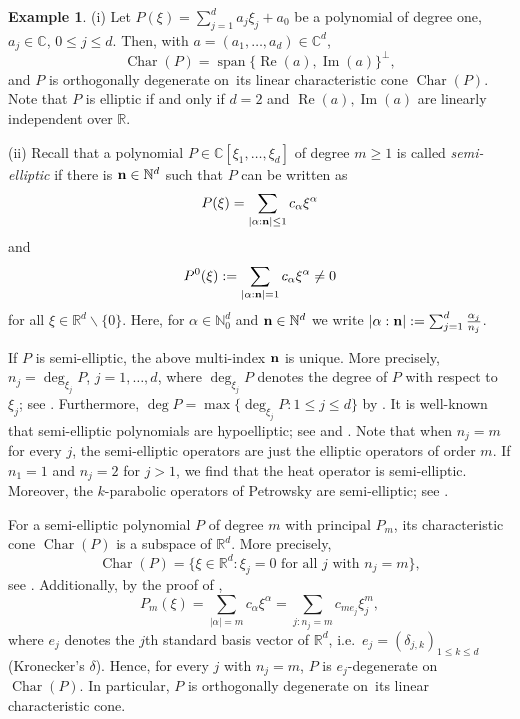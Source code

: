 \documentclass[a4paper,10pt]{amsart}
\newtheorem*{crucial lemma}{Lemma \ref{lem:nice polynomial2}}
\theoremstyle{definition}
\newtheorem{example}[theorem]{Example}
\newcommand{\R}{\mathbb{R}}
\newcommand{\C}{\mathbb{C}}
\newcommand{\N}{\mathbb{N}}
\newcommand{\charcone}{\operatorname{Char}}
\newcommand{\wniceon}[2]{$#1$-degenerate on~#2}
\newcommand{\veryniceon}[1]{orthogonally degenerate on~#1}
\begin{document}
\begin{example}\label{example}
    (i) Let $P(\xi)=\sum_{j=1}^d a_j\xi_j+a_0$ be a polynomial of degree one, $a_j\in\C$, $0\leq j\leq d$. Then, with $a=(a_1,\ldots,a_d)\in\C^d$,
    \[\charcone(P)=\operatorname{span}\{\operatorname{Re}(a),\operatorname{Im}(a)\}^\perp,\]
    and $P$ is \veryniceon{its linear characteristic cone $\charcone(P)$}. Note that $P$ is elliptic if and only if $d=2$ and $\operatorname{Re}(a), \operatorname{Im}(a)$ are linearly independent over $\R$.
    
    (ii) Recall that a polynomial $P\in\C[\xi_1,\ldots,\xi_d]$ of degree $m\geq1$ is called \textit{semi-elliptic} if there is  ${\bf{n}} \in\N^d$ such that $P$ can be written as 
    $$
    P(\xi)=\sum_{|\alpha: {\bf{n}}|\leq 1}c_\alpha\xi^\alpha
    $$ 
    and 
    $$
    P^0(\xi):=\sum_{|\alpha: {\bf{n}}|=1}c_\alpha\xi^\alpha\neq 0
    $$
    for all $\xi\in\R^d\backslash\{0\}$. Here, for $\alpha\in\N_0^d$ and ${\bf{n}}  \in\N^d$ we write $|\alpha:{\bf{n}}|:=\sum_{j=1}^d\frac{\alpha_j}{n_j}$.

    If $P$ is semi-elliptic, the above multi-index ${\bf{n}}$ is unique. More precisely, $n_j=\operatorname{deg}_{\xi_j}P$, $j= 1, \ldots, d$, where $\operatorname{deg}_{\xi_j}P$ denotes  the degree of $P$ with respect to  $\xi_j$; see \cite[Lemma 7.14]{Treves1966}. Furthermore,  $\deg P = \max\{\operatorname{deg}_{\xi_j}P\colon 1\leq j\leq d\}$ by \cite[Proposition 2]{FrerickKalmes10}. It is well-known that semi-elliptic polynomials are hypoelliptic; see \cite[Theorem 11.1.11]{Hor2} and \cite[Theorem 7.7]{Treves1966}. Note that when $n_j=m$ for every $j$, the semi-elliptic operators are just the elliptic operators of order $m$. If $n_1=1$ and $n_j=2$ for $j>1$, we find that the heat operator is semi-elliptic. Moreover, the $k$-parabolic operators of Petrowsky are semi-elliptic; see \cite[Definition 7.11]{Treves1966}. 

    For a semi-elliptic polynomial $P$ of degree $m$ with principal $P_m$, its characteristic cone $\charcone(P)$ is a subspace of $\R^d$. More precisely,
    \begin{equation}\label{eq:charactersitic semi-elliptic}
        \charcone(P)=\{\xi\in\R^d\colon \xi_j=0\text{ for all }j\text{ with }n_j=m\},
    \end{equation}
    see \cite[Proposition 2 (ii)]{FrerickKalmes10}. Additionally, by the proof of \cite[Proposition 2 (ii)]{FrerickKalmes10},
    \[P_m(\xi)=\sum_{|\alpha|=m}c_{\alpha}\xi^\alpha=\sum_{j\colon n_j=m}c_{me_j}\xi_j^m,\]
    where $e_j$ denotes the $j$th standard basis vector of $\R^d$, i.e.~$e_j=(\delta_{j,k})_{1\leq k\leq d}$ (Kron\-ecker's $\delta$). Hence, for every $j$ with $n_j=m$, $P$ is \wniceon{e_j}{$\charcone(P)$}. In particular, $P$ is \veryniceon{its linear characteristic cone}.
    

\end{example}
\end{document}

